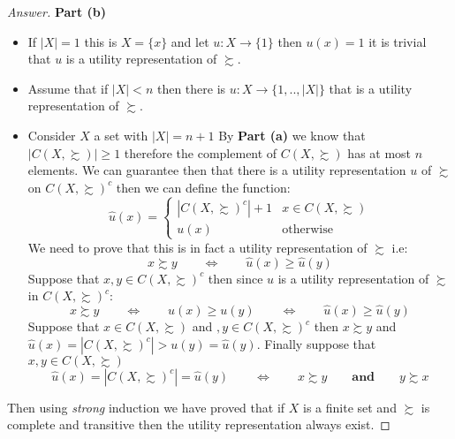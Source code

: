 \documentclass{article}
\theoremstyle{definition}
\newcommand{\qiffq}{\qquad \iff \qquad}
\newcommand{\qaq}{\qquad \textbf{and} \qquad}
\begin{document}
\begin{proof}[Answer]
\textbf{Part (b)}
\begin{itemize}
    \item If $|X| = 1$ this is $X=\{x\}$ and let $u:X \to \{1\}$ then $u(x)=1$ it is trivial that $u$ is a utility representation of $\succsim$.
    \item Assume that if $|X| < n$ then there is $u:X \to \{1,..,|X|\}$ that is a utility representation of $\succsim$.
    \item Consider $X$ a set with $|X|=n+1$ By \textbf{Part (a)} we know that $|C(X, \succsim)|\geq 1$ therefore the complement of $C(X, \succsim)$ has at most $n$ elements. We can guarantee then that there is a utility representation $u$ of $\succsim$ on $C(X, \succsim)^c$ then we can define the function:
    $$\hat{u}(x)=\left\{ \begin{array}{cc}
        |C(X, \succsim)^c| + 1 & x\in C(X, \succsim) \\
        u(x) & \text{otherwise}
    \end{array}$$
    We need to prove that this is in fact a utility representation of $\succsim$ i.e:
    $$x\succsim y \qiffq \hat{u}(x)\geq \hat{u}(y)$$
    Suppose that $x,y \in C(X, \succsim)^c$ then since $u$ is a utility representation of $\succsim$ in $C(X, \succsim)^c$:
    $$x\succsim y \qiffq u(x)\geq u(y) \qiffq \hat{u}(x)\geq \hat{u}(y)$$
    Suppose that $x\in C(X, \succsim)$ and $,y \in C(X, \succsim)^c$ then $x\succsim y$ and $\hat{u}(x)=|C(X, \succsim)^c|>u(y)=\hat{u}(y)$.
    Finally suppose that $x,y \in C(X, \succsim)$
    $$\hat{u}(x)=|C(X, \succsim)^c|=\hat{u}(y) \qiffq x\succsim y \qaq y \succsim x$$
\end{itemize}

Then using \textit{strong} induction we have proved that if $X$ is a finite set and $\succsim$ is complete and transitive then the utility representation always exist. 






\end{proof}
\end{document}
